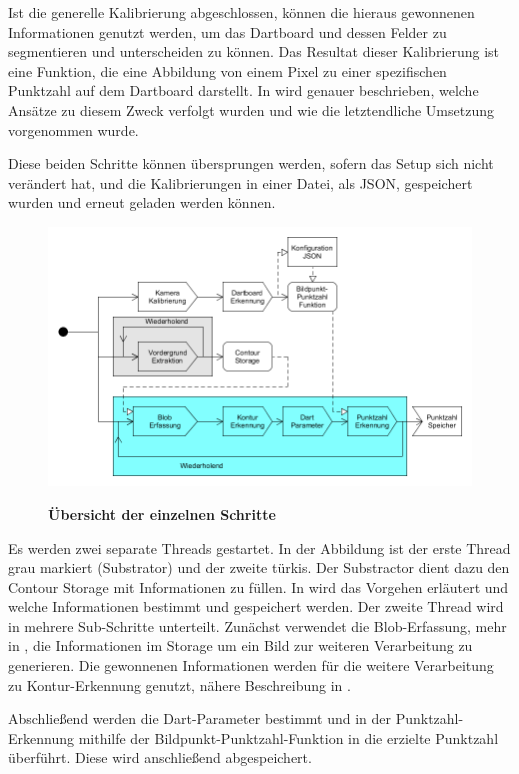 Ist die generelle Kalibrierung abgeschlossen, können die hieraus gewonnenen Informationen genutzt werden, um das Dartboard und dessen Felder zu segmentieren und unterscheiden zu können. Das Resultat dieser Kalibrierung ist eine Funktion, die eine Abbildung von einem Pixel zu einer spezifischen Punktzahl auf dem Dartboard darstellt. In  wird genauer beschrieben, welche Ansätze zu diesem Zweck verfolgt wurden und wie die letztendliche Umsetzung vorgenommen wurde.

Diese beiden Schritte können übersprungen werden, sofern das Setup sich nicht verändert hat, und die Kalibrierungen in einer Datei, als JSON, gespeichert wurden und erneut geladen werden können. 
\begin{figure}
\includegraphics[width=\textwidth]{media/pipeline.png}\\
\caption{\textbf{Übersicht der einzelnen Schritte}}
\label{Fig:pipeline}
\end{figure}

Es werden zwei separate Threads gestartet. In der Abbildung ist der erste Thread grau markiert (Substrator) und der zweite türkis. Der Substractor dient dazu den Contour Storage mit Informationen zu füllen. In  wird das Vorgehen erläutert und welche Informationen bestimmt und gespeichert werden.
Der zweite Thread wird in mehrere Sub-Schritte unterteilt. 
Zunächst verwendet die Blob-Erfassung, mehr in , die Informationen im Storage um ein Bild zur weiteren Verarbeitung zu generieren. Die gewonnenen Informationen werden für die weitere Verarbeitung zu Kontur-Erkennung genutzt, nähere Beschreibung in .

Abschließend werden die Dart-Parameter bestimmt und in der Punktzahl-Erkennung mithilfe der Bildpunkt-Punktzahl-Funktion in die erzielte Punktzahl überführt. Diese wird anschließend abgespeichert.


